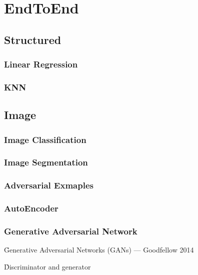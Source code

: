 \chapter{EndToEnd}

\section{Structured}

\subsection{Linear Regression}

\subsection{KNN}

\section{Image}

\subsection{Image Classification}

\subsection{Image Segmentation}

\subsection{Adversarial Exmaples}

\subsection{AutoEncoder}

\subsection{Generative Adversarial Network}
\label{generative_adversarial_network}

\r{Generative Adversarial Networks (GANs) --- Goodfellow 2014}

\r{Discriminator and generator}


